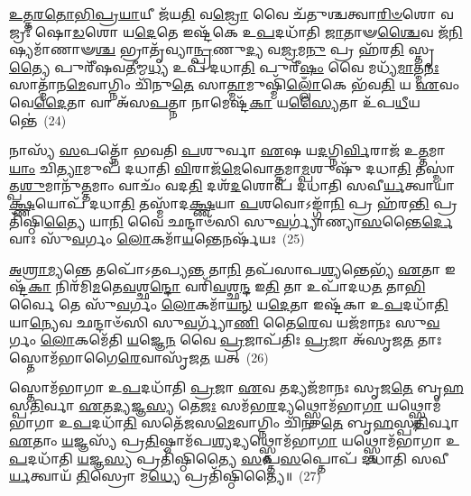 \-\ul{𑌉}\-\-\ul{𑌤𑍍𑌤}\-\-\ul{𑌰}\-\-\ul{𑌤𑍋}\-\-\ul{𑌭𑌿}\-\-\ul{𑌪𑍍𑌰}\-\-\ul{𑌯𑌾}\-𑌯𑍀 𑌜᳴𑌯\-\ul{𑌤𑌿} 𑌵\-\ul{𑌜𑍍𑌰𑍋} 𑌵𑍈 𑌚᳴𑌤𑍁𑌶𑍍𑌚𑌤𑍍𑌵𑌾\-\ul{𑌰𑌿}\-\-\ul{𑍞}\-𑌶𑍋 𑌵𑌜𑍍𑌰𑌃᳴ 𑌷𑍋\-\ul{𑌡}\-𑌶𑍋 𑌯\-\ul{𑌦𑍇}\-𑌤𑍇 𑌇𑌷𑍍𑌟᳴𑌕𑍇 𑌉\-\ul{𑌪}\-𑌦𑌧𑌾᳴𑌤𑌿 \ul{𑌜𑌾}\-𑌤𑌾𑍟\-\ul{𑌶𑍍𑌚𑍈}\-𑌵 𑌜᳴\-\ul{𑌨𑌿}\-𑌷𑍍𑌯𑌮𑌾᳴𑌣𑌾𑍟\-\ul{𑌶𑍍𑌚} 𑌭𑍍𑌰𑌾𑌤𑍃᳴𑌵𑍍𑌯𑌾\-\ul{𑌨𑍍𑌪𑍍𑌰}\-𑌣𑍁\-\ul{𑌦𑍍𑌯} 𑌵\-\ul{𑌜𑍍𑌰}\-𑌮\-\ul{𑌨𑍁} 𑌪𑍍𑌰 𑌹᳴𑌰\-\ul{𑌤𑌿} 𑌸𑍍𑌤𑍃\-\ul{𑌤𑍍𑌯𑍈} 𑌪𑍁𑌰𑍀᳴𑌷𑌵\-\ul{𑌤𑍀}\-𑌮𑍍𑌮\-\ul{𑌧𑍍𑌯} 𑌉𑌪᳴ 𑌦𑌧𑌾\-\ul{𑌤𑌿} 𑌪𑍁𑌰𑍀᳴\-\ul{𑌷𑌂} 𑌵𑍈 𑌮𑌧𑍍𑌯᳴\-\ul{𑌮𑌾}\-𑌤𑍍𑌮\-\ul{𑌨𑌃} 𑌸𑌾𑌤𑍍𑌮𑌾᳴𑌨\-\ul{𑌮𑍇}\-𑌵𑌾𑌗𑍍𑌨𑌿𑌂 𑌚𑌿᳴𑌨𑍁\-\ul{𑌤𑍇} 𑌸𑌾\-\ul{𑌤𑍍𑌮𑌾}\-𑌮𑍁𑌷𑍍𑌮𑌿᳴\-\ul{𑌲𑍍𑌲𑍋𑌁}\-𑌕𑍇 𑌭᳴𑌵\-\ul{𑌤𑌿} 𑌯 \ul{𑌏}\-𑌵𑌂 𑌵𑍇\-\ul{𑌦𑍈}\-𑌤𑌾 𑌵𑌾 𑌅᳴𑌸\-\ul{𑌪}\-𑌤𑍍𑌨𑌾 𑌨𑌾𑌮𑍇𑌷𑍍𑌟᳴\-\ul{𑌕𑌾} 𑌯\-\ul{𑌸𑍍𑌯𑍈}\-𑌤𑌾 𑌉᳴𑌪\-\ul{𑌧𑍀}\-𑌯𑌨𑍍𑌤𑍇॑~(24)

𑌨𑌾𑌸𑍍𑌯᳴ \ul{𑌸}\-𑌪𑌤𑍍𑌨𑍋᳴ 𑌭𑌵𑌤𑌿 \ul{𑌪}\-𑌶𑍁𑌰𑍍𑌵𑌾 \ul{𑌏}\-𑌷 𑌯\-\ul{𑌦}\-𑌗𑍍𑌨𑌿\-\ul{𑌰𑍍𑌵𑌿}\-𑌰𑌾𑌜᳴ 𑌉\-\ul{𑌤𑍍𑌤}\-𑌮𑌾\-\ul{𑌯𑌾𑌂} 𑌚𑌿\-\ul{𑌤𑍍𑌯𑌾}\-𑌮𑍁𑌪᳴ 𑌦𑌧𑌾𑌤𑌿 \ul{𑌵𑌿}\-𑌰𑌾𑌜᳴\-\ul{𑌮𑍇}\-𑌵𑍋\-\ul{𑌤𑍍𑌤}\-𑌮𑌾\-\ul{𑌮𑍍𑌪}\-𑌶𑍁𑌷𑍁᳴ 𑌦𑌧𑌾\-\ul{𑌤𑌿} 𑌤𑌸𑍍𑌮𑌾॑𑌤𑍍𑌪\-\ul{𑌶𑍁}\-𑌮𑌾𑌨𑍁᳴\-\ul{𑌤𑍍𑌤}\-𑌮𑌾𑌂 𑌵𑌾𑌚𑌂᳴ 𑌵𑌦\-\ul{𑌤𑌿} 𑌦𑌶᳴\-\ul{𑌦}\-𑌶𑍋𑌪᳴ 𑌦𑌧𑌾𑌤𑌿 𑌸𑌵𑍀\-\ul{𑌰𑍍𑌯}\-𑌤𑍍𑌵𑌾𑌯𑌾॑\-\ul{𑌕𑍍𑌷𑍍𑌣}\-𑌯𑍋𑌪᳴ 𑌦𑌧𑌾\-\ul{𑌤𑌿} 𑌤𑌸𑍍𑌮𑌾᳴𑌦\-\ul{𑌕𑍍𑌷𑍍𑌣}\-𑌯𑌾 \ul{𑌪}\-𑌶𑌵𑍋\-𑌽𑌙𑍍𑌗𑌾᳴\-\ul{𑌨𑌿} 𑌪𑍍𑌰 𑌹᳴𑌰\-\ul{𑌨𑍍𑌤𑌿} 𑌪𑍍𑌰𑌤𑌿᳴𑌷𑍍𑌠𑌿\-\ul{𑌤𑍍𑌯𑍈} 𑌯𑌾\-\ul{𑌨𑌿} 𑌵𑍈 𑌛𑌨𑍍𑌦𑌾𑍞᳴𑌸𑌿 𑌸𑍁\-\ul{𑌵}\-𑌰𑍍𑌗𑍍𑌯𑌾॑𑌣𑍍𑌯𑌾\-\ul{𑌸}\-𑌨𑍍𑌤𑍈\-\ul{𑌰𑍍𑌦𑍇}\-𑌵𑌾𑌃 𑌸𑍁᳴\-\ul{𑌵}\-𑌰𑍍𑌗𑌂 \ul{𑌲𑍋}\-𑌕𑌮𑌾᳴\-\ul{𑌯}\-𑌨𑍍𑌤𑍇𑌨𑌰𑍍\mbox{}𑌷᳴𑌯𑌃~(25)

\-\ul{𑌅}\-\-\ul{𑌶𑍍𑌰𑌾}\-\-\ul{𑌮𑍍𑌯}\-𑌨𑍍𑌤𑍇 𑌤𑌪𑍋᳴\-𑌽𑌤𑌪𑍍𑌯\-\ul{𑌨𑍍𑌤} 𑌤𑌾\-\ul{𑌨𑌿} 𑌤𑌪᳴𑌸𑌾𑌪\-\ul{𑌶𑍍𑌯}\-𑌨𑍍𑌤𑍇𑌭𑍍𑌯᳴ \ul{𑌏}\-𑌤𑌾 𑌇𑌷𑍍𑌟᳴\-\ul{𑌕𑌾} 𑌨𑌿𑌰᳴𑌮𑌿\-\ul{𑌮}\-𑌤𑍇\-\ul{𑌵}\-𑌶𑍍𑌛\-\ul{𑌨𑍍𑌦𑍋} 𑌵𑌰𑌿᳴\-\ul{𑌵}\-𑌶𑍍𑌛\-\ul{𑌨𑍍𑌦} 𑌇\-\ul{𑌤𑌿} 𑌤𑌾 𑌉𑌪𑌾᳴𑌦𑌧\-\ul{𑌤} 𑌤𑌾\-\ul{𑌭𑌿}\-𑌰𑍍𑌵𑍈 𑌤𑍇 𑌸𑍁᳴\-\ul{𑌵}\-𑌰𑍍𑌗𑌂 \ul{𑌲𑍋}\-𑌕𑌮𑌾᳴\-\ul{𑌯}\-\-\ul{𑌨𑍍} 𑌯\-\ul{𑌦𑍇}\-𑌤𑌾 𑌇𑌷𑍍𑌟᳴𑌕𑌾 𑌉\-\ul{𑌪}\-𑌦𑌧𑌾᳴\-\ul{𑌤𑌿} 𑌯𑌾\-\ul{𑌨𑍍𑌯𑍇}\-𑌵 𑌛𑌨𑍍𑌦𑌾𑍞᳴𑌸𑌿 𑌸𑍁\-\ul{𑌵}\-𑌰𑍍𑌗𑍍𑌯𑌾᳴\-\ul{𑌣𑌿} 𑌤𑍈\-\ul{𑌰𑍇}\-𑌵 𑌯𑌜᳴𑌮𑌾𑌨𑌃 𑌸𑍁\-\ul{𑌵}\-𑌰𑍍𑌗𑌂 \ul{𑌲𑍋}\-𑌕𑌮𑍇᳴𑌤𑌿 \ul{𑌯}\-𑌜𑍍𑌞𑍇\-\ul{𑌨} 𑌵𑍈 \ul{𑌪𑍍𑌰}\-𑌜𑌾𑌪᳴𑌤𑌿𑌃 \ul{𑌪𑍍𑌰}\-𑌜𑌾 𑌅᳴𑌸𑍃𑌜\-\ul{𑌤} 𑌤𑌾𑌃 𑌸𑍍𑌤𑍋𑌮᳴𑌭𑌾𑌗𑍈\-\ul{𑌰𑍇}\-𑌵𑌾𑌸𑍃᳴𑌜\-\ul{𑌤} 𑌯𑌤𑍍~(26)

𑌸𑍍𑌤𑍋𑌮᳴𑌭𑌾𑌗𑌾 𑌉\-\ul{𑌪}\-𑌦𑌧𑌾᳴𑌤𑌿 \ul{𑌪𑍍𑌰}\-𑌜𑌾 \ul{𑌏}\-𑌵 𑌤𑌦𑍍𑌯𑌜᳴𑌮𑌾𑌨𑌃 𑌸𑍃𑌜\-\ul{𑌤𑍇} 𑌬𑍃\-\ul{𑌹}\-𑌸𑍍𑌪\-\ul{𑌤𑌿}\-𑌰𑍍𑌵𑌾 \ul{𑌏}\-𑌤\-\ul{𑌦𑍍𑌯}\-𑌜𑍍𑌞\-\ul{𑌸𑍍𑌯} 𑌤𑍇\-\ul{𑌜𑌃} 𑌸𑌮᳴𑌭\-\ul{𑌰}\-𑌦𑍍𑌯𑌥𑍍𑌸𑍍𑌤𑍋𑌮᳴𑌭𑌾\-\ul{𑌗𑌾} 𑌯𑌥𑍍𑌸𑍍𑌤𑍋𑌮᳴𑌭𑌾𑌗𑌾 𑌉\-\ul{𑌪}\-𑌦𑌧𑌾᳴\-\ul{𑌤𑌿} 𑌸𑌤𑍇᳴𑌜𑌸\-\ul{𑌮𑍇}\-𑌵𑌾𑌗𑍍𑌨𑌿𑌂 𑌚𑌿᳴𑌨𑍁\-\ul{𑌤𑍇} 𑌬𑍃\-\ul{𑌹}\-𑌸𑍍𑌪\-\ul{𑌤𑌿}\-𑌰𑍍𑌵𑌾 \ul{𑌏}\-𑌤𑌾𑌂 \ul{𑌯}\-𑌜𑍍𑌞𑌸𑍍𑌯᳴ 𑌪𑍍𑌰\-\ul{𑌤𑌿}\-𑌷𑍍𑌠𑌾𑌮᳴𑌪\-\ul{𑌶𑍍𑌯}\-𑌦𑍍𑌯𑌥𑍍𑌸𑍍𑌤𑍋𑌮᳴𑌭𑌾\-\ul{𑌗𑌾} 𑌯𑌥𑍍𑌸𑍍𑌤𑍋𑌮᳴𑌭𑌾𑌗𑌾 𑌉\-\ul{𑌪}\-𑌦𑌧𑌾᳴𑌤𑌿 \ul{𑌯}\-𑌜𑍍𑌞\-\ul{𑌸𑍍𑌯} 𑌪𑍍𑌰𑌤𑌿᳴𑌷𑍍𑌠𑌿𑌤𑍍𑌯𑍈 \ul{𑌸}\-𑌪𑍍𑌤\-\ul{𑌸}\-𑌪𑍍𑌤𑍋𑌪᳴ 𑌦𑌧𑌾𑌤𑌿 𑌸𑌵𑍀\-\ul{𑌰𑍍𑌯}\-𑌤𑍍𑌵𑌾𑌯᳴ \ul{𑌤𑌿}\-𑌸𑍍𑌰𑍋 𑌮\-\ul{𑌧𑍍𑌯𑍇} 𑌪𑍍𑌰𑌤𑌿᳴𑌷𑍍𑌠𑌿𑌤𑍍𑌯𑍈॥~(27)

{\anuvakamend[{\-\ul{𑌉}\-\-\ul{𑌤𑍍𑌤}\-\-\ul{𑌰}\-𑌤𑍋 𑌧᳴\-\ul{𑌤𑍍𑌤𑍇} 𑌤𑌸𑍍𑌮𑌾᳴𑌦𑍁𑌪\-\ul{𑌧𑍀}\-𑌯\-\ul{𑌨𑍍𑌤} 𑌋𑌷᳴𑌯𑍋\-𑌽𑌸𑍃𑌜\-\ul{𑌤} 𑌯𑌤𑍍𑌤𑍍𑌰𑌿𑌚᳴𑌤𑍍𑌵𑌾𑌰𑌿𑍞𑌶𑌚𑍍𑌚}]}%

